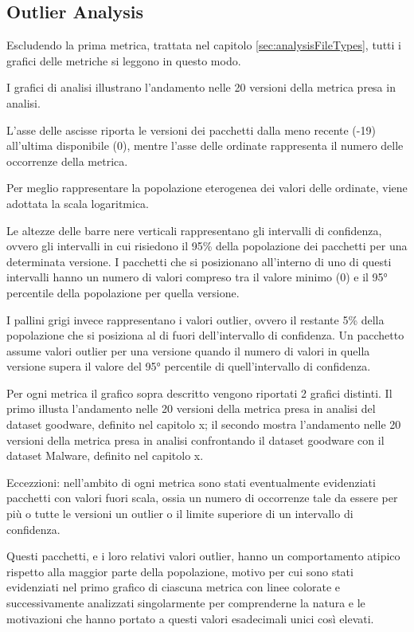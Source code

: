 \subsection{Outlier Analysis}

Escludendo la prima metrica, trattata nel capitolo \cref{sec:analysisFileTypes},
tutti i grafici delle metriche si leggono in questo modo.

I grafici di analisi illustrano 
l'andamento nelle 20 versioni
della metrica presa in analisi.


L'asse delle ascisse riporta le versioni dei pacchetti dalla meno recente (-19) all'ultima disponibile (0), mentre 
l'asse delle ordinate rappresenta il numero delle occorrenze della metrica.

Per meglio rappresentare la popolazione eterogenea dei valori delle ordinate, viene adottata la scala logaritmica.


Le altezze delle barre nere verticali rappresentano gli intervalli di confidenza, 
ovvero gli intervalli in cui risiedono il 95\% della popolazione dei pacchetti per una determinata versione.
I pacchetti che si posizionano all'interno di uno di questi intervalli
hanno un numero di valori compreso 
tra il valore minimo (0) e il 95° percentile della popolazione per quella versione.

I pallini grigi invece rappresentano i valori outlier,
ovvero il restante 5\% della popolazione che si posiziona al di fuori dell'intervallo di confidenza.
Un pacchetto assume valori outlier per una versione quando il numero di valori in quella versione supera il valore del 95° percentile
di quell'intervallo di confidenza.


Per ogni metrica il grafico sopra descritto vengono riportati 2 grafici distinti.
Il primo illusta l'andamento nelle 20 versioni
della metrica presa in analisi del dataset goodware, definito nel capitolo x;
il secondo mostra l'andamento nelle 20 versioni
della metrica presa in analisi confrontando il dataset goodware con il dataset Malware, 
definito nel capitolo x.

Eccezzioni: nell'ambito di ogni metrica sono stati eventualmente evidenziati pacchetti con valori 
fuori scala, ossia un numero di occorrenze tale da 
essere per più o tutte le versioni un outlier o il limite superiore di un intervallo di confidenza.


Questi pacchetti, e i loro relativi valori outlier, hanno 
un comportamento atipico rispetto alla maggior parte della popolazione,
motivo per cui sono stati evidenziati nel primo grafico di ciascuna metrica con linee colorate
e successivamente analizzati singolarmente
per comprenderne la natura e le motivazioni che hanno portato a questi valori esadecimali unici così elevati.



